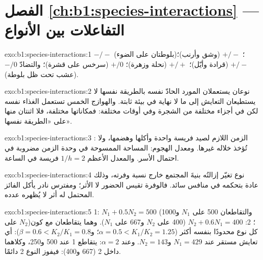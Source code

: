 \section*{الفصل \ref{ch:b1:species-interactions} --- التفاعلات بين الأنواع}

\begin{solution}{exo:b1:species-interactions:1}
 $-/-$ (بلوطتان على الضوء)؛  $+/-$ (وشق وأرنب)؛
 $+/-$ (قرادة وأيّل)؛  $+/+$ (نحلة وزهرة)؛
 $+/0$ (سرخس على قشرة)؛ والتضادّ $-/0$ (عشب تحت ظل
بلوطة).
\end{solution}

\begin{solution}{exo:b1:species-interactions:2}
نوعان يستعملان المورد الحادّ نفسه بالطريقة نفسها لا يستطيعان
التعايش إلى ما لا نهاية في بيئة ثابتة. والهوازج الخمس تستعمل
الغذاء نفسه لكن في أجزاء مختلفة من الشجرة وفي أوقات مختلفة:
فمكاناتها مختلفة، فلا اثنتان منها على «الطريقة نفسها».
\end{solution}

\begin{solution}{exo:b1:species-interactions:3}
: الزمن اللازم لصيد فريسة واحدة وأكلها وهضمها، ولا
تُؤخذ خلاله غيرها. ومعدل الهجوم: المساحة الممسوحة في وحدة الزمن
مضروبة في احتمال الأسر. والمعدل الأعظم $1/h = 2$ فريسة في
الساعة.
\end{solution}

\begin{solution}{exo:b1:species-interactions:4}
نوع تغيّر إزالتُه بنيةَ المجتمع خارج
نسبة وفرته، وذلك عادة بتحكمه في منافس سائد. فالوفرة تقيس
الحضور لا الأثر؛ ومفترس نادر يأكل الفائز المحتمل له أثر لا
يُظهره عدده.
\end{solution}

\begin{solution}{exo:b1:species-interactions:5}
 1: $N_1 + 0.5 N_2 = 500$ (والتقاطعان 500 على $N_1$ و1000 على
$N_2$)؛  2: $N_2 + 0.6 N_1 = 400$ (400 على $N_2$ و667 على $N_1$).
وهما يتقاطعان مع كون كل نوع محدودًا بنفسه أكثر ($\alpha = 0.5 <
K_1/K_2 = 1.25$؛ و$\beta = 0.6 < K_2/K_1 = 0.8$): أي تعايش مستقر
عند $N_1 = 429$ و$N_2 = 143$. وعند $\alpha = 2$: يتقاطع  1 عند
500 و250، وكلاهما داخل  2 (667 و400): فيفوز النوع 2
دائمًا.
\end{solution}

